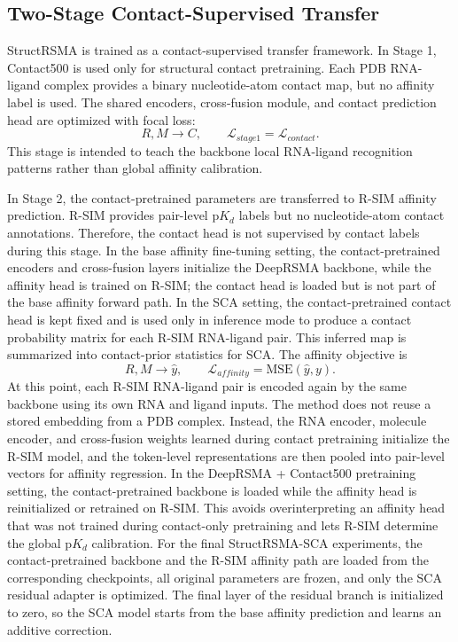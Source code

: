 ﻿\documentclass[journal=jcisd8,manuscript=article]{achemso}
\begin{document}
\subsection{Two-Stage Contact-Supervised Transfer}

StructRSMA is trained as a contact-supervised transfer framework. In Stage 1, Contact500 is used only for structural contact pretraining. Each PDB RNA-ligand complex provides a binary nucleotide-atom contact map, but no affinity label is used. The shared encoders, cross-fusion module, and contact prediction head are optimized with focal loss:
\begin{equation}
R,M \rightarrow C, \qquad \mathcal{L}_{stage1} = \mathcal{L}_{contact}.
\end{equation}
This stage is intended to teach the backbone local RNA-ligand recognition patterns rather than global affinity calibration.

In Stage 2, the contact-pretrained parameters are transferred to R-SIM affinity prediction. R-SIM provides pair-level p$K_d$ labels but no nucleotide-atom contact annotations. Therefore, the contact head is not supervised by contact labels during this stage. In the base affinity fine-tuning setting, the contact-pretrained encoders and cross-fusion layers initialize the DeepRSMA backbone, while the affinity head is trained on R-SIM; the contact head is loaded but is not part of the base affinity forward path. In the SCA setting, the contact-pretrained contact head is kept fixed and is used only in inference mode to produce a contact probability matrix for each R-SIM RNA-ligand pair. This inferred map is summarized into contact-prior statistics for SCA. The affinity objective is
\begin{equation}
R,M \rightarrow \hat{y}, \qquad
\mathcal{L}_{affinity} = \mathrm{MSE}(\hat{y},y).
\end{equation}
At this point, each R-SIM RNA-ligand pair is encoded again by the same backbone using its own RNA and ligand inputs. The method does not reuse a stored embedding from a PDB complex. Instead, the RNA encoder, molecule encoder, and cross-fusion weights learned during contact pretraining initialize the R-SIM model, and the token-level representations are then pooled into pair-level vectors for affinity regression.
In the DeepRSMA + Contact500 pretraining setting, the contact-pretrained backbone is loaded while the affinity head is reinitialized or retrained on R-SIM. This avoids overinterpreting an affinity head that was not trained during contact-only pretraining and lets R-SIM determine the global p$K_d$ calibration. For the final StructRSMA-SCA experiments, the contact-pretrained backbone and the R-SIM affinity path are loaded from the corresponding checkpoints, all original parameters are frozen, and only the SCA residual adapter is optimized. The final layer of the residual branch is initialized to zero, so the SCA model starts from the base affinity prediction and learns an additive correction.
\end{document}
